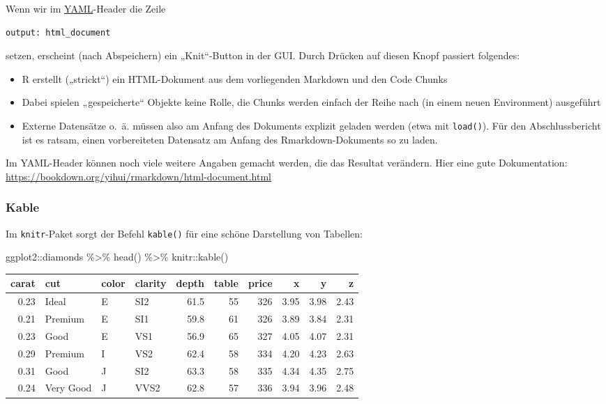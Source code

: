\documentclass[
  ngerman,
]{article}
\newenvironment{Shaded}{\begin{snugshade}}{\end{snugshade}}
\newcommand{\FunctionTok}[1]{\textcolor[rgb]{0.00,0.00,0.00}{#1}}
\newcommand{\NormalTok}[1]{#1}
\newcommand{\SpecialCharTok}[1]{\textcolor[rgb]{0.00,0.00,0.00}{#1}}
\providecommand{\tightlist}{%
  \setlength{\itemsep}{0pt}\setlength{\parskip}{0pt}}
\begin{document}
Wenn wir im \href{https://de.wikipedia.org/wiki/YAML}{YAML}-Header die Zeile

\begin{verbatim}
output: html_document
\end{verbatim}

setzen, erscheint (nach Abspeichern) ein „Knit``-Button in der GUI. Durch Drücken auf diesen Knopf passiert folgendes:

\begin{itemize}
\tightlist
\item
  R erstellt („strickt``) ein HTML-Dokument aus dem vorliegenden Markdown und den Code Chunks
\item
  Dabei spielen „gespeicherte`` Objekte keine Rolle, die Chunks werden einfach der Reihe nach (in einem neuen Environment) ausgeführt
\item
  Externe Datensätze o.~ä. müssen also am Anfang des Dokuments explizit geladen werden (etwa mit \texttt{load()}). Für den Abschlussbericht ist es ratsam, einen vorbereiteten Datensatz am Anfang des Rmarkdown-Dokuments so zu laden.
\end{itemize}

Im YAML-Header können noch viele weitere Angaben gemacht werden, die das Resultat verändern. Hier eine gute Dokumentation: \url{https://bookdown.org/yihui/rmarkdown/html-document.html}

\hypertarget{kable}{%
\subsubsection{Kable}\label{kable}}

Im \texttt{knitr}-Paket sorgt der Befehl \texttt{kable()} für eine schöne Darstellung von Tabellen:

\begin{Shaded}
\begin{Highlighting}[]
\NormalTok{ggplot2}\SpecialCharTok{::}\NormalTok{diamonds }\SpecialCharTok{\%\textgreater{}\%}
  \FunctionTok{head}\NormalTok{() }\SpecialCharTok{\%\textgreater{}\%}
\NormalTok{  knitr}\SpecialCharTok{::}\FunctionTok{kable}\NormalTok{()}
\end{Highlighting}
\end{Shaded}

\begin{tabular}{r|l|l|l|r|r|r|r|r|r}
\hline
carat & cut & color & clarity & depth & table & price & x & y & z\\
\hline
0.23 & Ideal & E & SI2 & 61.5 & 55 & 326 & 3.95 & 3.98 & 2.43\\
\hline
0.21 & Premium & E & SI1 & 59.8 & 61 & 326 & 3.89 & 3.84 & 2.31\\
\hline
0.23 & Good & E & VS1 & 56.9 & 65 & 327 & 4.05 & 4.07 & 2.31\\
\hline
0.29 & Premium & I & VS2 & 62.4 & 58 & 334 & 4.20 & 4.23 & 2.63\\
\hline
0.31 & Good & J & SI2 & 63.3 & 58 & 335 & 4.34 & 4.35 & 2.75\\
\hline
0.24 & Very Good & J & VVS2 & 62.8 & 57 & 336 & 3.94 & 3.96 & 2.48\\
\hline
\end{tabular}
\end{document}
